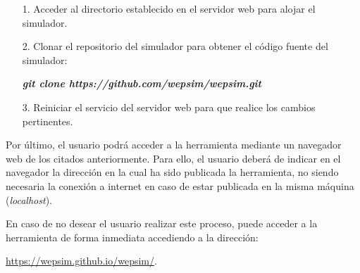 \begin{itemize}

	\item[1.] Acceder al directorio establecido en el servidor web para alojar el simulador.

	\item[2.] Clonar el repositorio del simulador para obtener el código fuente del simulador:
	
	 \textbf{\textit{git clone https://github.com/wepsim/wepsim.git}}
	
	\item[3.] Reiniciar el servicio del servidor web para que realice los cambios pertinentes.

\end{itemize}

Por último, el usuario podrá acceder a la herramienta mediante un navegador web de los citados anteriormente. Para ello, el usuario deberá de indicar en el navegador la dirección en la cual ha sido publicada la herramienta, no siendo necesaria la conexión a internet en caso de estar publicada en la misma máquina (\textit{localhost}).

En caso de no desear el usuario realizar este proceso, puede acceder a la herramienta de forma inmediata accediendo a la dirección: 

\url{https://wepsim.github.io/wepsim/}.